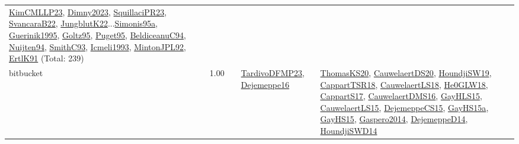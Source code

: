 {\begin{longtable}{p{3cm}r>{\raggedright\arraybackslash}p{6cm}>{\raggedright\arraybackslash}p{6cm}>{\raggedright\arraybackslash}p{8cm}}
\hyperref[detail:KimCMLLP23]{KimCMLLP23}, \hyperref[detail:Dimny2023]{Dimny2023}, \hyperref[detail:SquillaciPR23]{SquillaciPR23}, \hyperref[detail:SvancaraB22]{SvancaraB22}, \hyperref[detail:JungblutK22]{JungblutK22}...\hyperref[detail:Simonis95a]{Simonis95a}, \hyperref[detail:Guerinik1995]{Guerinik1995}, \hyperref[detail:Goltz95]{Goltz95}, \hyperref[detail:Puget95]{Puget95}, \hyperref[detail:BeldiceanuC94]{BeldiceanuC94}, \hyperref[detail:Nuijten94]{Nuijten94}, \hyperref[detail:SmithC93]{SmithC93}, \hyperref[detail:Icmeli1993]{Icmeli1993}, \hyperref[detail:MintonJPL92]{MintonJPL92}, \hyperref[detail:ErtlK91]{ErtlK91} (Total: 239)\\
\index{bitbucket}\index{Benchmarks!bitbucket}bitbucket &  1.00 &  & \hyperref[detail:TardivoDFMP23]{TardivoDFMP23}, \hyperref[detail:Dejemeppe16]{Dejemeppe16} & \hyperref[detail:ThomasKS20]{ThomasKS20}, \hyperref[detail:CauwelaertDS20]{CauwelaertDS20}, \hyperref[detail:HoundjiSW19]{HoundjiSW19}, \hyperref[detail:CappartTSR18]{CappartTSR18}, \hyperref[detail:CauwelaertLS18]{CauwelaertLS18}, \hyperref[detail:He0GLW18]{He0GLW18}, \hyperref[detail:CappartS17]{CappartS17}, \hyperref[detail:CauwelaertDMS16]{CauwelaertDMS16}, \hyperref[detail:GayHLS15]{GayHLS15}, \hyperref[detail:CauwelaertLS15]{CauwelaertLS15}, \hyperref[detail:DejemeppeCS15]{DejemeppeCS15}, \hyperref[detail:GayHS15a]{GayHS15a}, \hyperref[detail:GayHS15]{GayHS15}, \hyperref[detail:Gaspero2014]{Gaspero2014}, \hyperref[detail:DejemeppeD14]{DejemeppeD14}, \hyperref[detail:HoundjiSWD14]{HoundjiSWD14}\\

\end{longtable}}

